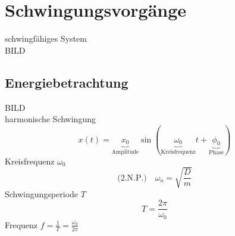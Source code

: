 \chapter{Schwingungsvorgänge}
schwingfähiges System \\
BILD

\section{Energiebetrachtung}
BILD \\

harmonische Schwingung
\[ x(t) = \underbrace{x_0}_{\text{Amplitude}} \sin( \underbrace{\omega_0}_{\text{Kreisfrequenz}} t + \underbrace{\phi_0}_{\text{Phase}} ) \]
Kreisfrequenz $\omega_0$
\[ \text{(2.N.P.)} \quad \omega_o = \sqrt{\frac{D}{m}} \]
Schwingungsperiode $T$
\[ \boxed{ T = \frac{2\pi}{\omega_0} } \]
Frequenz $f = \frac{1}{T} = \frac{\omega_0}{2\pi}$
